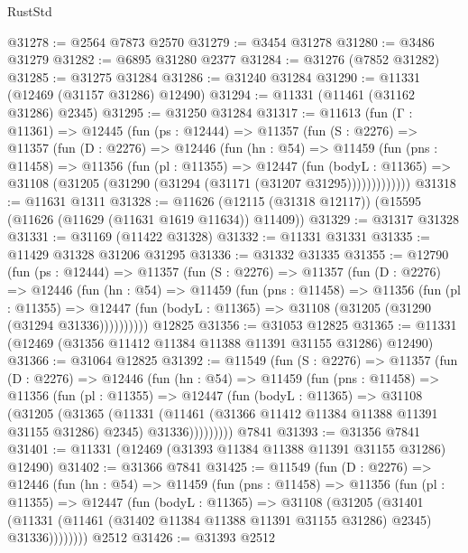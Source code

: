 \begin{lexlean}{RustStd}
\begin{coremodule}
@31278 := @2564 @7873 @2570
@31279 := @3454 @31278
@31280 := @3486 @31279
@31282 := @6895 @31280 @2377
@31284 := @31276 (@7852 @31282)
@31285 := @31275 @31284
@31286 := @31240 @31284
@31290 := @11331 (@12469 (@31157 @31286) @12490)
@31294 := @11331 (@11461 (@31162 @31286) @2345)
@31295 := @31250 @31284
@31317 := @11613
    (fun (Γ : @11361) =>
    @12445
      (fun (ps : @12444) =>
      @11357
        (fun (S : @2276) =>
        @11357
          (fun (D : @2276) =>
          @12446
            (fun (hn : @54) =>
            @11459
              (fun (pns : @11458) =>
              @11356
                (fun (pl : @11355) =>
                @12447
                  (fun (bodyL : @11365) =>
                  @31108 (@31205 (@31290 (@31294 (@31171 (@31207 @31295)))))))))))))
@31318 := @11631 @1311
@31328 := @11626 (@12115 (@31318 @12117)) (@15595 (@11626 (@11629 (@11631 @1619 @11634)) @11409))
@31329 := @31317 @31328
@31331 := @31169 (@11422 @31328)
@31332 := @11331 @31331
@31335 := @11429 @31328 @31206 @31295
@31336 := @31332 @31335
@31355 := @12790
    (fun (ps : @12444) =>
    @11357
      (fun (S : @2276) =>
      @11357
        (fun (D : @2276) =>
        @12446
          (fun (hn : @54) =>
          @11459
            (fun (pns : @11458) =>
            @11356
              (fun (pl : @11355) =>
              @12447 (fun (bodyL : @11365) => @31108 (@31205 (@31290 (@31294 @31336))))))))))
    @12825
@31356 := @31053 @12825
@31365 := @11331 (@12469 (@31356 @11412 @11384 @11388 @11391 @31155 @31286) @12490)
@31366 := @31064 @12825
@31392 := @11549
    (fun (S : @2276) =>
    @11357
      (fun (D : @2276) =>
      @12446
        (fun (hn : @54) =>
        @11459
          (fun (pns : @11458) =>
          @11356
            (fun (pl : @11355) =>
            @12447
              (fun (bodyL : @11365) =>
              @31108
                (@31205
                  (@31365
                    (@11331
                      (@11461 (@31366 @11412 @11384 @11388 @11391 @31155 @31286) @2345)
                      @31336)))))))))
    @7841
@31393 := @31356 @7841
@31401 := @11331 (@12469 (@31393 @11384 @11388 @11391 @31155 @31286) @12490)
@31402 := @31366 @7841
@31425 := @11549
    (fun (D : @2276) =>
    @12446
      (fun (hn : @54) =>
      @11459
        (fun (pns : @11458) =>
        @11356
          (fun (pl : @11355) =>
          @12447
            (fun (bodyL : @11365) =>
            @31108
              (@31205
                (@31401
                  (@11331 (@11461 (@31402 @11384 @11388 @11391 @31155 @31286) @2345) @31336))))))))
    @2512
@31426 := @31393 @2512

\end{coremodule}
\end{lexlean}
